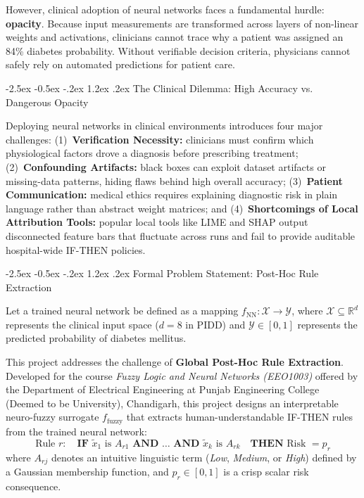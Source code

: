 \documentclass[12pt,a4paper,oneside]{report}
\makeatletter
\renewcommand\section{\@startsection {section}{1}{\z@}%
                                   {-2.5ex \@plus -0.5ex \@minus -.2ex}%
                                   {1.2ex \@plus .2ex}%
                                   {\normalfont\fontsize{13}{16}\selectfont\bfseries}}
\makeatother
\begin{document}
However, clinical adoption of neural networks faces a fundamental hurdle: \textbf{opacity}. Because input measurements are transformed across layers of non-linear weights and activations, clinicians cannot trace why a patient was assigned an 84\% diabetes probability. Without verifiable decision criteria, physicians cannot safely rely on automated predictions for patient care.

\section{The Clinical Dilemma: High Accuracy vs. Dangerous Opacity}

Deploying neural networks in clinical environments introduces four major challenges: (1)~\textbf{Verification Necessity:} clinicians must confirm which physiological factors drove a diagnosis before prescribing treatment; (2)~\textbf{Confounding Artifacts:} black boxes can exploit dataset artifacts or missing-data patterns, hiding flaws behind high overall accuracy; (3)~\textbf{Patient Communication:} medical ethics requires explaining diagnostic risk in plain language rather than abstract weight matrices; and (4)~\textbf{Shortcomings of Local Attribution Tools:} popular local tools like LIME and SHAP output disconnected feature bars that fluctuate across runs and fail to provide auditable hospital-wide IF-THEN policies.

\section{Formal Problem Statement: Post-Hoc Rule Extraction}

Let a trained neural network be defined as a mapping $f_{\text{NN}}: \mathcal{X} \to \mathcal{Y}$, where $\mathcal{X} \subseteq \mathbb{R}^d$ represents the clinical input space ($d=8$ in PIDD) and $\mathcal{Y} \in [0, 1]$ represents the predicted probability of diabetes mellitus.

This project addresses the challenge of \textbf{Global Post-Hoc Rule Extraction}. Developed for the course \textit{Fuzzy Logic and Neural Networks (EEO1003)} offered by the Department of Electrical Engineering at Punjab Engineering College (Deemed to be University), Chandigarh, this project designs an interpretable neuro-fuzzy surrogate $f_{\text{fuzzy}}$ that extracts human-understandable IF-THEN rules from the trained neural network:
\begin{equation}
    \text{Rule } r: \quad \textbf{IF } \tilde{x}_1 \text{ is } A_{r1} \textbf{ AND } \dots \textbf{ AND } \tilde{x}_k \text{ is } A_{rk} \quad \textbf{THEN } \text{Risk } = p_r
\end{equation}
where $A_{rj}$ denotes an intuitive linguistic term (\textit{Low}, \textit{Medium}, or \textit{High}) defined by a Gaussian membership function, and $p_r \in [0, 1]$ is a crisp scalar risk consequence.
\end{document}
